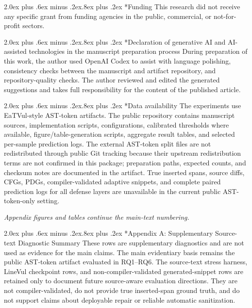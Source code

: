 \documentclass[letterpaper,twocolumn,10pt,twoside]{article}
\makeatletter
\renewcommand\section{\@startsection{section}{1}{\z@}%
  {2.0ex plus .6ex minus .2ex}{.8ex plus .2ex}%
  {\normalfont\large\bfseries}}
\makeatother
\begin{document}
\section*{Funding}
This research did not receive any specific grant from funding agencies in the public, commercial, or not-for-profit sectors.

\section*{Declaration of generative AI and AI-assisted technologies in the manuscript preparation process}
During preparation of this work, the author used OpenAI Codex to assist with language polishing, consistency checks between the manuscript and artifact repository, and repository-quality checks. The author reviewed and edited the generated suggestions and takes full responsibility for the content of the published article.

\section*{Data availability}
The experiments use EaTVul-style AST-token artifacts. The public repository contains manuscript sources, implementation scripts, configurations, calibrated thresholds where available, figure/table-generation scripts, aggregate result tables, and selected per-sample prediction logs. The external AST-token split files are not redistributed through public Git tracking because their upstream redistribution terms are not confirmed in this package; preparation paths, expected counts, and checksum notes are documented in the artifact. True inserted spans, source diffs, CFGs, PDGs, compiler-validated adaptive snippets, and complete paired prediction logs for all defense layers are unavailable in the current public AST-token-only setting.

\FloatBarrier
\clearpage
\bgroup
\small


\egroup

\clearpage
\onecolumn
\noindent\textit{Appendix figures and tables continue the main-text numbering.}
\par\vspace{4pt}
\section*{Appendix A: Supplementary Source-text Diagnostic Summary}
\noindent These rows are supplementary diagnostics and are not used as evidence for the main claims. The main evidentiary basis remains the public AST-token artifact evaluated in RQ1--RQ6. The source-text stress harness, LineVul checkpoint rows, and non-compiler-validated generated-snippet rows are retained only to document future source-aware evaluation directions. They are not compiler-validated, do not provide true inserted-span ground truth, and do not support claims about deployable repair or reliable automatic sanitization.
\end{document}
